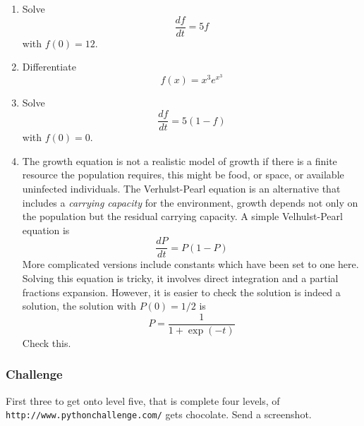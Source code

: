 \documentclass[12pt]{article}
\begin{document}
\begin{enumerate}

\item Solve 
\begin{equation}
\frac{df}{dt}=5f
\end{equation}
with $f(0)=12$.

\item Differentiate 
\begin{equation}
f(x)=x^3e^{x^3}
\end{equation}

\item Solve
\begin{equation}
\frac{df}{dt}=5(1-f)
\end{equation}
with $f(0)=0$.

\item The growth equation is not a realistic model of growth if there
  is a finite resource the population requires, this might be food, or
  space, or available uninfected individuals. The Verhulst-Pearl
  equation is an alternative that includes a \textsl{carrying
    capacity} for the environment, growth depends not only on the
  population but the residual carrying capacity. A simple
  Velhulst-Pearl equation is
\begin{equation}
\frac{dP}{dt}=P(1-P)
\end{equation}
More complicated versions include constants which have been set to one here. Solving this equation is tricky, it involves direct integration and a partial fractions expansion. However, it is easier to check the solution is indeed a solution, the solution with $P(0)=1/2$ is
\begin{equation}
P=\frac{1}{1+\exp(-t)}
\end{equation}
Check this.
\end{enumerate}

\subsubsection*{Challenge}
First three to get onto level five, that is complete four levels, of \texttt{http://www.pythonchallenge.com/} gets chocolate. Send a screenshot.
\end{document}
